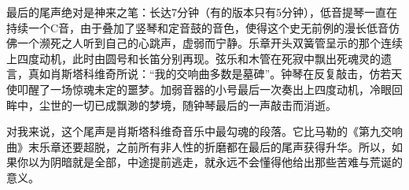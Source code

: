 \documentclass[a4paper,left=2.5cm,right=2.5cm,11pt]{article}
\begin{document}
	最后的尾声绝对是神来之笔：长达7分钟（有的版本只有5分钟），低音提琴一直在持续一个C音，由于叠加了竖琴和定音鼓的音色，使得这个史无前例的漫长低音仿佛一个濒死之人听到自己的心跳声，虚弱而宁静。乐章开头双簧管呈示的那个连续上四度动机，此时由圆号和长笛分别再现。弦乐和木管在死寂中飘出死魂灵的遗言，真如肖斯塔科维奇所说：“我的交响曲多数是墓碑”。钟琴在反复敲击，仿若天使叩醒了一场惊魂未定的噩梦。加弱音器的小号最后一次奏出上四度动机，冷眼回眸中，尘世的一切已成飘渺的梦境，随钟琴最后的一声敲击而消逝。\par

	对我来说，这个尾声是肖斯塔科维奇音乐中最勾魂的段落。它比马勒的《第九交响曲》末乐章还要超脱，之前所有非人性的折磨都在最后的尾声获得升华。所以，如果你以为阴暗就是全部，中途提前逃走，就永远不会懂得他给出那些苦难与荒诞的意义。
	
\end{document}
